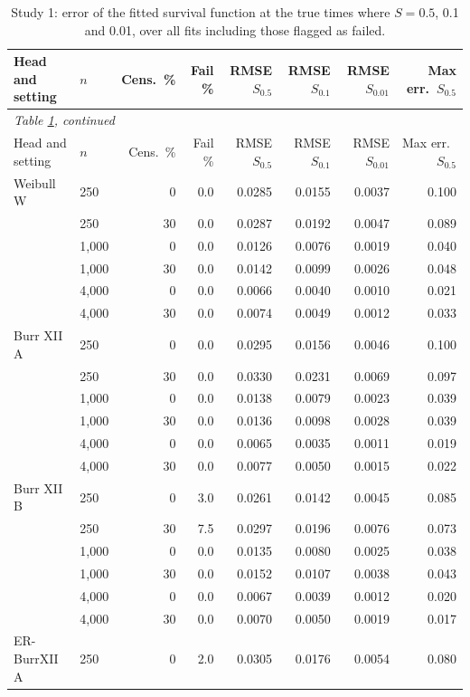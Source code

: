 {\footnotesize
\begin{longtable}{llrrrrrr}
\caption{Study 1: error of the fitted survival function at the true times where $S = 0.5$, 0.1 and 0.01, over all fits including those flagged as failed.}\label{stab:survival}\\
\toprule
Head and setting & $n$ & Cens.\ \% & Fail \% & RMSE $S_{0.5}$ & RMSE $S_{0.1}$ & RMSE $S_{0.01}$ & Max err.\ $S_{0.5}$ \\
\midrule
\endfirsthead
\multicolumn{8}{l}{\emph{Table \ref{stab:survival}, continued}}\\
\toprule
Head and setting & $n$ & Cens.\ \% & Fail \% & RMSE $S_{0.5}$ & RMSE $S_{0.1}$ & RMSE $S_{0.01}$ & Max err.\ $S_{0.5}$ \\
\midrule
\endhead
\bottomrule
\endfoot
Weibull W & 250 & 0 & 0.0 & 0.0285 & 0.0155 & 0.0037 & 0.100 \\
 & 250 & 30 & 0.0 & 0.0287 & 0.0192 & 0.0047 & 0.089 \\
 & 1,000 & 0 & 0.0 & 0.0126 & 0.0076 & 0.0019 & 0.040 \\
 & 1,000 & 30 & 0.0 & 0.0142 & 0.0099 & 0.0026 & 0.048 \\
 & 4,000 & 0 & 0.0 & 0.0066 & 0.0040 & 0.0010 & 0.021 \\
 & 4,000 & 30 & 0.0 & 0.0074 & 0.0049 & 0.0012 & 0.033 \\
Burr XII A & 250 & 0 & 0.0 & 0.0295 & 0.0156 & 0.0046 & 0.100 \\
 & 250 & 30 & 0.0 & 0.0330 & 0.0231 & 0.0069 & 0.097 \\
 & 1,000 & 0 & 0.0 & 0.0138 & 0.0079 & 0.0023 & 0.039 \\
 & 1,000 & 30 & 0.0 & 0.0136 & 0.0098 & 0.0028 & 0.039 \\
 & 4,000 & 0 & 0.0 & 0.0065 & 0.0035 & 0.0011 & 0.019 \\
 & 4,000 & 30 & 0.0 & 0.0077 & 0.0050 & 0.0015 & 0.022 \\
Burr XII B & 250 & 0 & 3.0 & 0.0261 & 0.0142 & 0.0045 & 0.085 \\
 & 250 & 30 & 7.5 & 0.0297 & 0.0196 & 0.0076 & 0.073 \\
 & 1,000 & 0 & 0.0 & 0.0135 & 0.0080 & 0.0025 & 0.038 \\
 & 1,000 & 30 & 0.0 & 0.0152 & 0.0107 & 0.0038 & 0.043 \\
 & 4,000 & 0 & 0.0 & 0.0067 & 0.0039 & 0.0012 & 0.020 \\
 & 4,000 & 30 & 0.0 & 0.0070 & 0.0050 & 0.0019 & 0.017 \\
ER-BurrXII A & 250 & 0 & 2.0 & 0.0305 & 0.0176 & 0.0054 & 0.080 \\

\end{longtable}}
